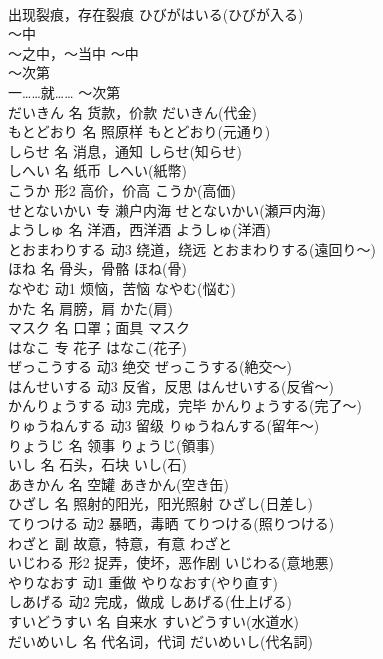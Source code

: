 \documentclass[8pt]{extreport}
\begin{document}
\begin{CJK}{UTF8}{min}
\\	出现裂痕，存在裂痕	ひびがはいる(ひびが入る)	
\\	～中	
\\	～之中，～当中	～中	
\\	～次第	
\\	一……就……	～次第	
\\	だいきん	名	货款，价款	だいきん(代金)	
\\	もとどおり	名	照原样	もとどおり(元通り)	
\\	しらせ	名	消息，通知	しらせ(知らせ)	
\\	しへい	名	纸币	しへい(紙幣)	
\\	こうか	形2	高价，价高	こうか(高価)	
\\	せとないかい	专	濑户内海	せとないかい(瀬戸内海)	
\\	ようしゅ	名	洋酒，西洋酒	ようしゅ(洋酒)	
\\	とおまわりする	动3	绕道，绕远	とおまわりする(遠回り～)	
\\	ほね	名	骨头，骨骼	ほね(骨)	
\\	なやむ	动1	烦恼，苦恼	なやむ(悩む)	
\\	かた	名	肩膀，肩	かた(肩)	
\\	マスク	名	口罩；面具	マスク	
\\	はなこ	专	花子	はなこ(花子)	
\\	ぜっこうする	动3	绝交	ぜっこうする(絶交～)	
\\	はんせいする	动3	反省，反思	はんせいする(反省～)	
\\	かんりょうする	动3	完成，完毕	かんりょうする(完了～)	
\\	りゅうねんする	动3	留级	りゅうねんする(留年～)	
\\	りょうじ	名	领事	りょうじ(領事)	
\\	いし	名	石头，石块	いし(石)	
\\	あきかん	名	空罐	あきかん(空き缶)	
\\	ひざし	名	照射的阳光，阳光照射	ひざし(日差し)	
\\	てりつける	动2	暴晒，毒晒	てりつける(照りつける)	
\\	わざと	副	故意，特意，有意	わざと	
\\	いじわる	形2	捉弄，使坏，恶作剧	いじわる(意地悪)	
\\	やりなおす	动1	重做	やりなおす(やり直す)	
\\	しあげる	动2	完成，做成	しあげる(仕上げる)	
\\	すいどうすい	名	自来水	すいどうすい(水道水)	
\\	だいめいし	名	代名词，代词	だいめいし(代名詞)	

\end{CJK}
\end{document}
